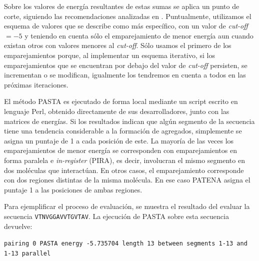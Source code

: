Sobre los valores de energía resultantes de estas sumas se aplica un punto de corte, siguiendo las recomendaciones analizadas en \cite{walsh2014pasta}.
Puntualmente, utilizamos el esquema de valores que se describe como más específico, con un valor de \textit{cut-off}$=-5$ y teniendo en cuenta 
sólo el emparejamiento de menor energía aun cuando existan otros con valores menores al \textit{cut-off}.
Sólo usamos el primero de los emparejamientos porque, al implementar un esquema iterativo, si los emparejamientos que se encuentran por debajo  del valor de \textit{cut-off} persisten, se incrementan o se modifican,
igualmente los tendremos en cuenta a todos en las próximas iteraciones. 



El método PASTA es ejecutado de forma local mediante un script escrito en lenguaje Perl, obtenido directamente de sus desarrolladores, junto con las matrices de energías.
Si los resultados indican que algún segmento de la secuencia tiene una tendencia considerable a la formación de agregados, 
simplemente se asigna un puntaje de 1 a cada posición de este.
La mayoría de las veces los emparejamientos de menor energía se corresponden con emparejamientos en forma paralela e \textit{in-register} (PIRA), es decir, involucran el mismo segmento en dos moléculas que interactúan. En otros casos, el emparejamiento corresponde con dos regiones distintas de la misma molécula. En ese caso PATENA asigna el puntaje 1 a las posiciones de ambas regiones. 

Para ejemplificar el proceso de evaluación, se muestra el resultado del evaluar la secuencia \texttt{VTNVGGAVVTGVTAV}.
La ejecución de PASTA sobre esta secuencia devuelve: \\
\noindent
\begin{adjustbox}{width=\textwidth}
\texttt{pairing 0  PASTA energy -5.735704  length 13  between segments 1-13 and 1-13  parallel}
\end{adjustbox}

